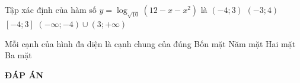 \begin{ex}%
Tập xác định của hàm số $y=\log_{\sqrt{10}}(12-x-x^2)$ là
\choice
{\True $(-4;3)$}
{$(-3;4)$}
{$[-4;3]$}
{$(-\infty;-4)\cup (3;+\infty)$}
\end{ex}

\begin{ex}%
Mỗi cạnh của hình đa diện là cạnh chung của đúng
\choice
{Bốn mặt}
{Năm mặt}
{\True Hai mặt}
{Ba mặt}
\end{ex}

\newpage
\begin{center}
	\textbf{ĐÁP ÁN}
\end{center}
\begin{multicols}{10}
	 
\end{multicols}
